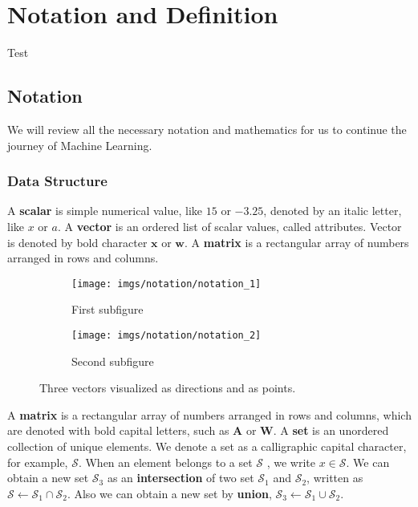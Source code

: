 \chapter{Notation and Definition}
Test
\section{Notation}

We will review all the necessary notation and mathematics for us to continue the journey of Machine Learning.

\subsection{Data Structure}

A \textbf{scalar} is simple numerical value, like $15$ or $-3.25$, denoted by an italic letter, like $x$ or $a$. A \textbf{vector} is an ordered list of scalar values, called attributes. Vector is denoted by bold character $\mathbf{x}$ or $\mathbf{w}$. A \textbf{matrix} is a rectangular array of numbers arranged in rows and columns.

\begin{figure}[H]
	\begin{subfigure}[t]{0.45\linewidth}
		\centering
		\texttt{[image: imgs/notation/notation\_1]}
		\caption{First subfigure}
	\end{subfigure}
	\hfill %
	\begin{subfigure}[t]{0.45\linewidth}
		\centering
		\texttt{[image: imgs/notation/notation\_2]}
		\caption{Second subfigure}
	\end{subfigure}
	\caption{Three vectors visualized as directions and as points.}
	\label{fig:notation_1}
\end{figure}

A \textbf{matrix} is a rectangular array of numbers arranged in rows and columns, which are denoted with bold capital letters, such as $\mathbf{A}$ or $\mathbf{W}$.  A \textbf{set} is an unordered collection of unique elements. We denote a set as a calligraphic capital character, for example, \(\mathcal{S}\). When an element belongs to a set \(\mathcal{S}\) , we write $x\in\mathcal{S}$. We can obtain a new set $\mathcal{S}_3$ as an \textbf{intersection} of two set $\mathcal{S}_1$ and $\mathcal{S}_2$, written as $\mathcal{S} \leftarrow\mathcal{S}_{1} \cap \mathcal{S}_{2}$. Also we can obtain a new set by \textbf{union}, $\mathcal{S}_3\leftarrow\mathcal{S}_1\cup\mathcal{S}_2$.

